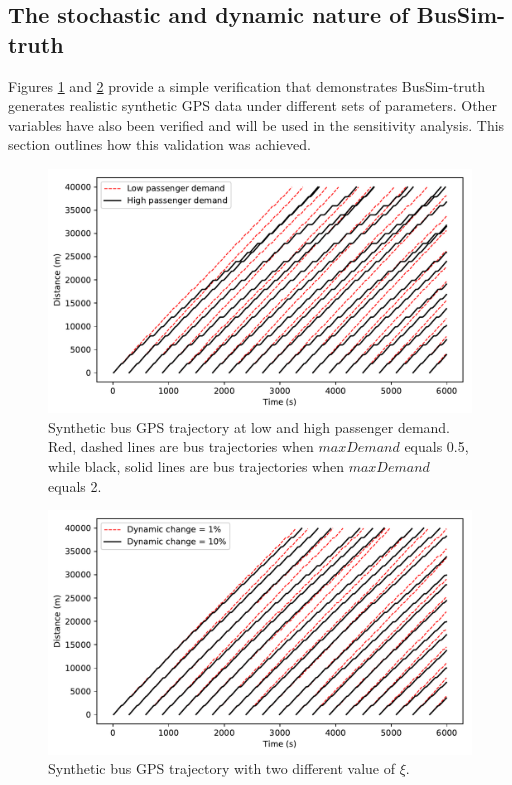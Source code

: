 \subsection{The stochastic and dynamic nature of BusSim-truth}

Figures  \ref{fig:2stochastic} and \ref{fig:2dynamic} provide a simple verification that demonstrates BusSim-truth generates realistic synthetic GPS data under different sets of parameters. Other variables have also been verified and will be used in the sensitivity analysis. This section outlines how this validation was achieved.

\begin{figure}[h]
	\centering
	\includegraphics[width=1\textwidth]{Figures/Fig_spacetime_2stochastic.pdf}
	\caption{Synthetic bus GPS trajectory at low and high passenger demand. Red, dashed lines are bus trajectories when $maxDemand$ equals 0.5, while black, solid lines are bus trajectories when $maxDemand$ equals 2.}
	\label{fig:2stochastic}
\end{figure}

\begin{figure}[h!]
	\centering
	\includegraphics[width=1\textwidth]{Figures/Fig_spacetime_2dynamic.pdf}
	\caption{Synthetic bus GPS trajectory with two different value of $\xi$.}
	\label{fig:2dynamic}
\end{figure}

